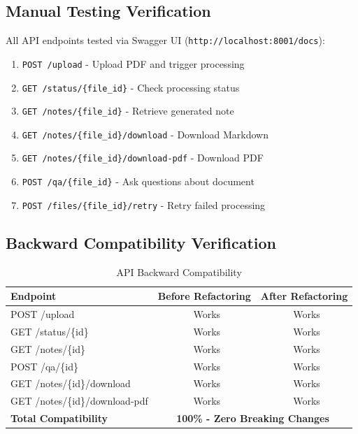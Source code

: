 \documentclass[11pt,a4paper]{article}
\newcommand{\cmark}{\checkmark}
\begin{document}
\subsection{Manual Testing Verification}

All API endpoints tested via Swagger UI (\texttt{http://localhost:8001/docs}):

\begin{enumerate}
    \item \texttt{POST /upload} - Upload PDF and trigger processing \cmark
    \item \texttt{GET /status/\{file\_id\}} - Check processing status \cmark
    \item \texttt{GET /notes/\{file\_id\}} - Retrieve generated note \cmark
    \item \texttt{GET /notes/\{file\_id\}/download} - Download Markdown \cmark
    \item \texttt{GET /notes/\{file\_id\}/download-pdf} - Download PDF \cmark
    \item \texttt{POST /qa/\{file\_id\}} - Ask questions about document \cmark
    \item \texttt{POST /files/\{file\_id\}/retry} - Retry failed processing \cmark
\end{enumerate}

\subsection{Backward Compatibility Verification}

\begin{table}[H]
\centering
\begin{tabular}{|l|c|c|}
\hline
\textbf{Endpoint} & \textbf{Before Refactoring} & \textbf{After Refactoring} \\
\hline
POST /upload & \cmark~Works & \cmark~Works \\
GET /status/\{id\} & \cmark~Works & \cmark~Works \\
GET /notes/\{id\} & \cmark~Works & \cmark~Works \\
POST /qa/\{id\} & \cmark~Works & \cmark~Works \\
GET /notes/\{id\}/download & \cmark~Works & \cmark~Works \\
GET /notes/\{id\}/download-pdf & \cmark~Works & \cmark~Works \\
\hline
\textbf{Total Compatibility} & \multicolumn{2}{c|}{\textbf{100\% - Zero Breaking Changes}} \\
\hline
\end{tabular}
\caption{API Backward Compatibility}
\end{table}
\end{document}
